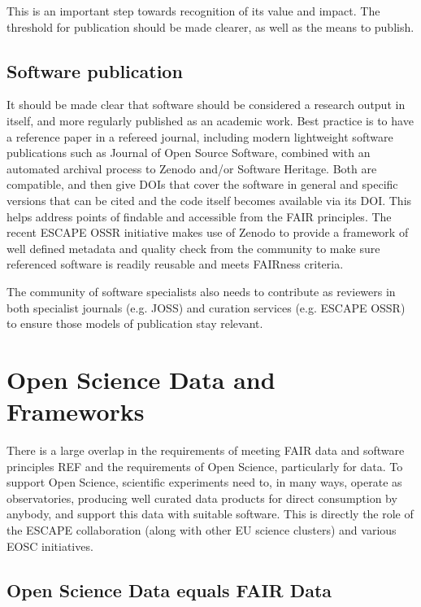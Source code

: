 This is an important step towards recognition of its value and impact. The threshold for publication should be made clearer, as well as the means to publish.


\subsection{Software publication}

It should be made clear that software should be considered a research output in itself, and more regularly published as an academic work. Best practice is to have a reference paper in a refereed journal, including modern lightweight software publications such as Journal of Open Source Software, combined with an automated archival process to Zenodo and/or Software Heritage. Both are compatible, and then give DOIs that cover the software in general and specific versions that can be cited and the code itself becomes available via its DOI. This helps address points of findable and accessible from the FAIR principles. The recent ESCAPE OSSR initiative makes use of Zenodo to provide a framework of well defined metadata and quality check from the community to make sure referenced software is readily reusable and meets FAIRness criteria.

The community of software specialists also needs to contribute as reviewers in both specialist journals (e.g. JOSS) and curation services (e.g. ESCAPE OSSR) to ensure those models of publication stay relevant.


\section{Open Science Data and Frameworks}

There is a large overlap in the requirements of meeting FAIR data and software principles REF
and the requirements of Open Science, particularly for data. To support Open Science, scientific experiments need to, in many ways, operate as observatories, producing well curated data products for direct consumption by anybody, and support this data with suitable software. This is directly the role of the ESCAPE collaboration (along with other EU science clusters) and various EOSC initiatives.


\subsection{Open Science Data equals FAIR Data}

